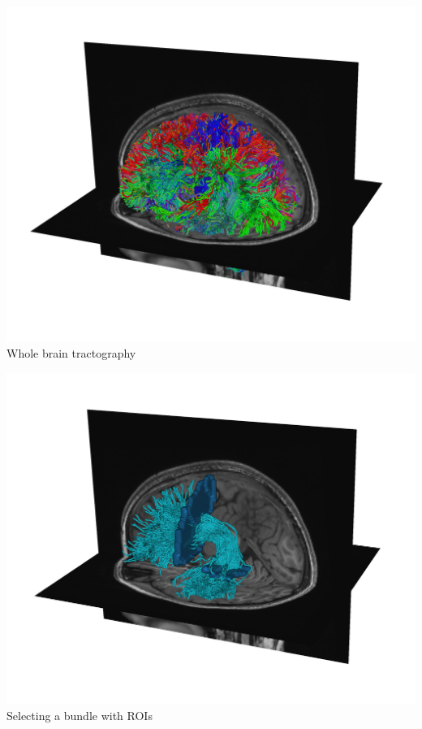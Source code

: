 \documentclass[a0paper,landscape,fontscale=0.385]{baposter}
\newenvironment{Figure}
  {\par\medskip\noindent\minipage{\linewidth}}
  {\endminipage\par\medskip}
\begin{document}
\begin{poster}
{\vspace{-1em}
\begin{multicols}{4}
    \begin{Figure}
        \centering
        \includegraphics[width=1.0\linewidth]{whole_brain_trk.png}
        Whole brain tractography
    \end{Figure}
    \columnbreak
    \begin{Figure}
        \centering
        \includegraphics[width=1.0\linewidth]{arc_trk.png}
        Selecting a bundle with ROIs
    \end{Figure}


\end{multicols}}
\end{poster}
\end{document}
